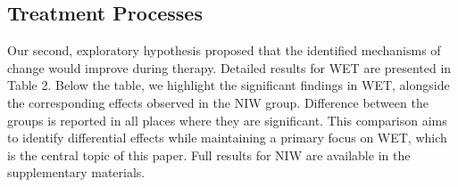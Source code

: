 \documentclass[
  man,floatsintext]{apa7}
\begin{document}
\subsection{Treatment Processes}\label{treatment-processes}

Our second, exploratory hypothesis proposed that the identified mechanisms of change would improve during therapy.
Detailed results for WET are presented in Table 2.
Below the table, we highlight the significant findings in WET, alongside the corresponding effects observed in the NIW group.
Difference between the groups is reported in all places where they are significant.
This comparison aims to identify differential effects while maintaining a primary focus on WET, which is the central topic of this paper.
Full results for NIW are available in the supplementary materials.
\end{document}
